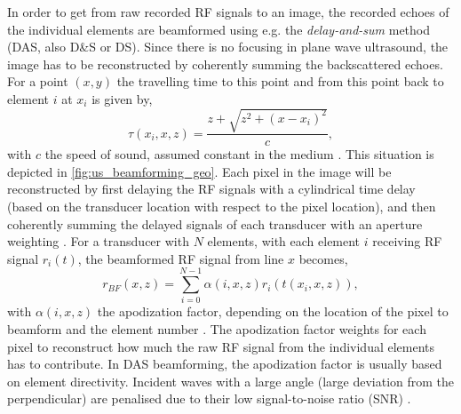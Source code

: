 In order to get from raw recorded RF signals to an image, the recorded echoes of the individual elements are beamformed using e.g. the \textit{delay-and-sum} method (DAS, also D\&S or DS). Since there is no focusing in plane wave ultrasound, the image has to be reconstructed by coherently summing the backscattered echoes. For a point $(x,y)$ the travelling time to this point and from this point back to element $i$ at $x_i$ is given by,
\begin{equation}
    \tau \left( x_i, x, z \right) = \frac{z + \sqrt{z^2 + {\left( x- x_i \right)}^2 }}{c},
\end{equation}
with $c$ the speed of sound, assumed constant in the medium \cite{montaldo_coherent_2009}. This situation is depicted in \autoref{fig:us_beamforming_geo}. Each pixel in the image will be reconstructed by first delaying the RF signals with a cylindrical time delay (based on the transducer location with respect to the pixel location), and then coherently summing the delayed signals of each transducer with an aperture weighting \cite{tanter_ultrafast_2002}. For a transducer with $N$ elements, with each element $i$ receiving RF signal $r_i(t)$, the beamformed RF signal from line $x$ becomes, 
\begin{equation}
    r_{BF} \left( x, z\right) = \sum_{i=0}^{N-1} \alpha\left(i,x,z \right) r_i \left(  t \left( x_i, x, z \right) \right),
\end{equation}
with $\alpha(i,x,z)$ the apodization factor, depending on the location of the pixel to beamform and the element number \cite{holfort_broadband_2009}. The apodization factor weights for each pixel to reconstruct how much the raw RF signal from the individual elements has to contribute. In DAS beamforming, the apodization factor is usually based on element directivity. Incident waves with a large angle (large deviation from the perpendicular) are penalised due to their low signal-to-noise ratio (SNR) \cite{chen_improved_2018}. %

